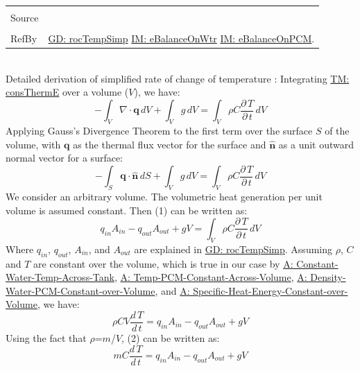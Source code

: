 \documentclass[12pt]{article}
\begin{document}
\begin{minipage}{\textwidth}
\begin{tabular}{p{} p{}}
\\ \midrule \\
Source & 
\\ \midrule \\
RefBy & \hyperref[GD:rocTempSimp]{GD: rocTempSimp} \hyperref[IM:eBalanceOnWtr]{IM: eBalanceOnWtr} \hyperref[IM:eBalanceOnPCM]{IM: eBalanceOnPCM}.
\\ \bottomrule \end{tabular}
\end{minipage}\\
Detailed derivation of simplified rate of change of temperature :
Integrating \hyperref[T:consThermE]{TM: consThermE} over a volume ($V$), we have:
\begin{dmath}
-\int_{V}{∇\cdot{}\mathbf{q}}\,dV+\int_{V}{g}\,dV=\int_{V}{ρ C \frac{\partial{}\,T}{\partial{}\,t}}\,dV
\end{dmath}
Applying Gauss's Divergence Theorem to the first term over the surface $S$ of the volume, with $\mathbf{q}$ as the thermal flux vector for the surface and $\mathbf{\hat{n}}$ as a unit outward normal vector for a surface:
\begin{dmath}
-\int_{S}{\mathbf{q}\cdot{}\mathbf{\hat{n}}}\,dS+\int_{V}{g}\,dV=\int_{V}{ρ C \frac{\partial{}\,T}{\partial{}\,t}}\,dV
\end{dmath}
We consider an arbitrary volume. The volumetric heat generation per unit volume is assumed constant. Then (1) can be written as:
\begin{dmath}
{q_{in}} {A_{in}}-{q_{out}} {A_{out}}+g V=\int_{V}{ρ C \frac{\partial{}\,T}{\partial{}\,t}}\,dV
\end{dmath}
Where ${q_{in}}$, ${q_{out}}$, ${A_{in}}$, and ${A_{out}}$ are explained in \hyperref[GD:rocTempSimp]{GD: rocTempSimp}. Assuming $ρ$, $C$ and $T$ are constant over the volume, which is true in our case by \hyperref[A:Constant-Water-Temp-Across-Tank]{A: Constant-Water-Temp-Across-Tank}, \hyperref[A:Temp-PCM-Constant-Across-Volume]{A: Temp-PCM-Constant-Across-Volume}, \hyperref[A:Density-Water-PCM-Constant-over-Volume]{A: Density-Water-PCM-Constant-over-Volume}, and \hyperref[A:Specific-Heat-Energy-Constant-over-Volume]{A: Specific-Heat-Energy-Constant-over-Volume}, we have:
\begin{dmath}
ρ C V \frac{d\,T}{d\,t}={q_{in}} {A_{in}}-{q_{out}} {A_{out}}+g V
\end{dmath}
Using the fact that $ρ$=$m$/$V$, (2) can be written as:
\begin{dmath}
m C \frac{d\,T}{d\,t}={q_{in}} {A_{in}}-{q_{out}} {A_{out}}+g V
\end{dmath}
\end{document}
